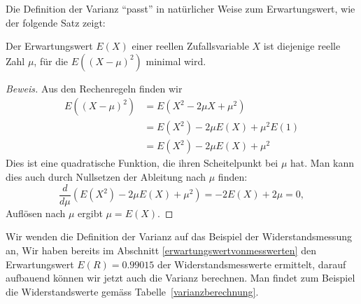 Die Definition der Varianz ``passt'' in natürlicher Weise zum Erwartungswert,
wie der folgende Satz zeigt:
\begin{satz}\label{erwartungswert-charakterisierung}
Der Erwartungswert $E(X)$ einer reellen Zufallsvariable $X$ ist diejenige
reelle Zahl $\mu$, für die $E((X-\mu)^2)$ minimal wird.
\end{satz}
\begin{proof}[Beweis]
Aus den Rechenregeln finden wir
\begin{align*}
E((X-\mu)^2)
&=
E(X^2-2\mu X+\mu^2)
\\
&=
E(X^2)-2\mu E(X) +\mu^2E(1)
\\
&=
E(X^2)-2\mu E(X) +\mu^2
\end{align*}
Dies ist eine quadratische Funktion, die ihren Scheitelpunkt bei $\mu$ hat.
Man kann dies auch durch Nullsetzen der Ableitung nach $\mu$ finden:
\[
\frac{d}{d\mu}\left(E(X^2)-2\mu E(X) +\mu^2\right)=-2 E(X)+2\mu=0,
\]
Auflösen nach $\mu$ ergibt $\mu=E(X)$.
\end{proof}
Wir wenden die Definition der Varianz auf das Beispiel der Widerstandsmessung
an,
Wir haben bereits im Abschnitt \ref{erwartungswertvonmesswerten}
den Erwartungswert $E(R)=0.99015$ der Widerstandsmesswerte ermittelt, darauf aufbauend
können wir jetzt auch die Varianz berechnen.
Man findet zum Beispiel die Widerstandswerte gemäss
Tabelle~\ref{varianzberechnung}.

